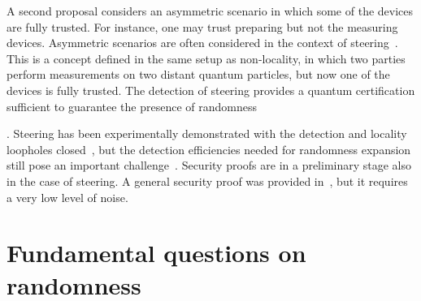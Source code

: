 \documentclass[11pt,a4paper]{article}
\begin{document}
A second proposal considers an asymmetric scenario in which some of the devices are fully trusted. For instance, %
one may trust preparing but not the measuring devices. Asymmetric scenarios are often considered in the context of steering~\cite{WJD}. This is a concept defined in the same setup as non-locality, in which two parties perform measurements on two distant quantum particles, but now one of the devices is fully trusted.  The detection of steering provides a quantum certification sufficient to guarantee the presence of randomness~{\cite{branciard}.
Steering has been experimentally demonstrated with the detection and locality loopholes closed~\cite{expsteering1, expsteering2, expsteering3},
but the detection efficiencies needed for randomness expansion still pose an important challenge~\cite{passaro}. Security proofs are in a preliminary stage also in the case of steering. A general security proof was provided in~\cite{tomamichel}, but it requires a very low level of noise.





\section{Fundamental questions on randomness}
\label{foundations}





}
\end{document}
